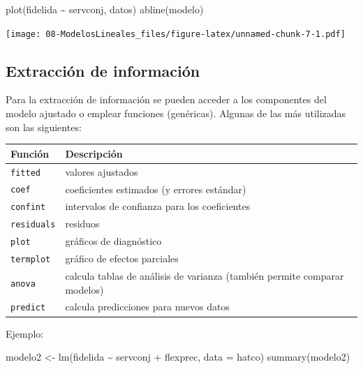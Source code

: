 \documentclass[
]{book}
\newenvironment{Shaded}{\begin{snugshade}}{\end{snugshade}}
\newcommand{\AttributeTok}[1]{\textcolor[rgb]{0.77,0.63,0.00}{#1}}
\newcommand{\FunctionTok}[1]{\textcolor[rgb]{0.00,0.00,0.00}{#1}}
\newcommand{\NormalTok}[1]{#1}
\newcommand{\OtherTok}[1]{\textcolor[rgb]{0.56,0.35,0.01}{#1}}
\newcommand{\SpecialCharTok}[1]{\textcolor[rgb]{0.00,0.00,0.00}{#1}}
\theoremstyle{break}
\theoremstyle{nonumberplain}
\begin{document}
\begin{Shaded}
\begin{Highlighting}[]
\FunctionTok{plot}\NormalTok{(fidelida }\SpecialCharTok{\textasciitilde{}}\NormalTok{ servconj, datos)}
\FunctionTok{abline}\NormalTok{(modelo)}
\end{Highlighting}
\end{Shaded}

\texttt{[image: 08-ModelosLineales\_files/figure-latex/unnamed-chunk-7-1.pdf]}

\hypertarget{extracciuxf3n-de-informaciuxf3n}{%
\subsection{Extracción de información}\label{extracciuxf3n-de-informaciuxf3n}}

Para la extracción de información se pueden acceder a los componentes del modelo ajustado o emplear funciones (genéricas). Algunas de las más utilizadas son las siguientes:

\begin{longtable}[]{@{}
  >{\raggedright\arraybackslash}p{}
  >{\raggedright\arraybackslash}p{}@{}}
\toprule
Función & Descripción \\
\midrule
\endhead
\texttt{fitted} & valores ajustados \\
\texttt{coef} & coeficientes estimados (y errores estándar) \\
\texttt{confint} & intervalos de confianza para los coeficientes \\
\texttt{residuals} & residuos \\
\texttt{plot} & gráficos de diagnóstico \\
\texttt{termplot} & gráfico de efectos parciales \\
\texttt{anova} & calcula tablas de análisis de varianza (también permite comparar modelos) \\
\texttt{predict} & calcula predicciones para nuevos datos \\
\bottomrule
\end{longtable}

Ejemplo:

\begin{Shaded}
\begin{Highlighting}[]
\NormalTok{modelo2 }\OtherTok{\textless{}{-}} \FunctionTok{lm}\NormalTok{(fidelida }\SpecialCharTok{\textasciitilde{}}\NormalTok{ servconj }\SpecialCharTok{+}\NormalTok{ flexprec, }\AttributeTok{data =}\NormalTok{ hatco)}
\FunctionTok{summary}\NormalTok{(modelo2)}
\end{Highlighting}
\end{Shaded}
\end{document}
